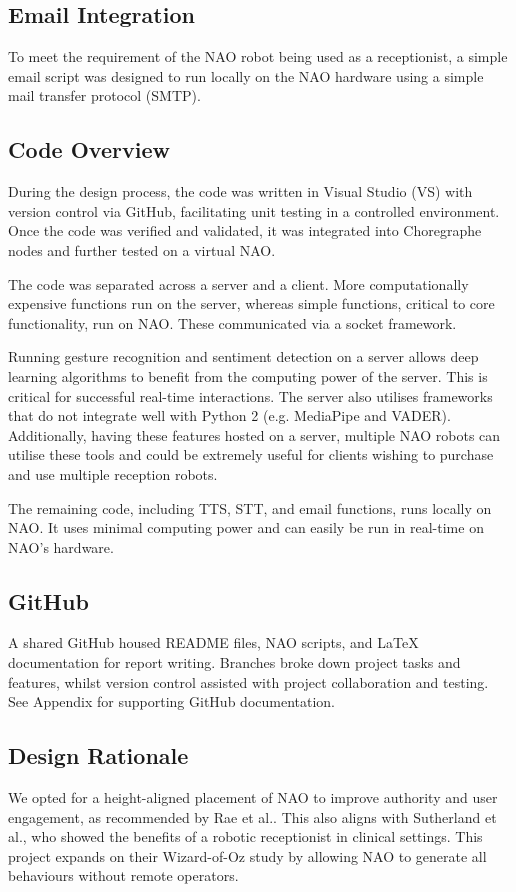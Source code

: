 \documentclass[conference]{IEEEtran}
\begin{document}
\subsection{Email Integration} To meet the requirement of the NAO robot being used as a receptionist, a simple email script was designed to run locally on the NAO hardware using a simple mail transfer protocol (SMTP).

\subsection{Code Overview} During the design process, the code was written in Visual Studio (VS) with version control via GitHub, facilitating unit testing in a controlled environment. Once the code was verified and validated, it was integrated into Choregraphe nodes and further tested on a virtual NAO. 

The code was separated across a server and a client. More computationally expensive functions run on the server, whereas simple functions, critical to core functionality, run on NAO. These communicated via a socket framework.

Running gesture recognition and sentiment detection on a server allows deep learning algorithms to benefit from the computing power of the server. This is critical for successful real-time interactions. The server also utilises frameworks that do not integrate well with Python 2 (e.g.  MediaPipe and VADER). Additionally, having these features hosted on a server, multiple NAO robots can utilise these tools and could be extremely useful for clients wishing to purchase and use multiple reception robots.

The remaining code, including TTS, STT, and email functions, runs locally on NAO. It uses minimal computing power and can easily be run in real-time on NAO’s hardware.

\subsection{GitHub} A shared GitHub housed README files, NAO scripts, and LaTeX documentation for report writing. Branches broke down project tasks and features, whilst version control assisted with project collaboration and testing. See Appendix for supporting GitHub documentation.

\subsection{Design Rationale} We opted for a height-aligned placement of NAO to improve authority and user engagement,
as recommended by Rae et al.\cite{Rae2013}. This also aligns with Sutherland et al.\cite{Sutherland2019}, who showed the benefits of
a robotic receptionist in clinical settings. This project expands on their Wizard-of-Oz study by allowing NAO to generate all behaviours without remote operators.
\end{document}
